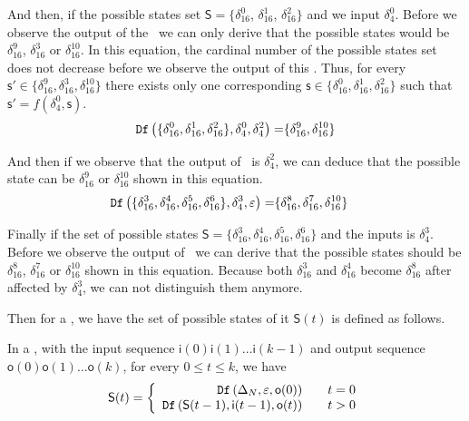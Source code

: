 \begin{example}
And then, if the possible states set $\mathsf{S}=\{\delta_{16}^0$, $\delta_{16}^1$, $\delta_{16}^2\}$ and we input $\delta_4^0$. Before we observe the output of the \BCN\ we can only derive that the possible states would be $\delta_{16}^{9}$, $\delta_{16}^3$ or  $\delta_{16}^{10}$. In this equation, the cardinal number of the possible states set does not decrease before we observe the output of this \BCN. Thus, for every $\mathsf{s}'\in\{\delta_{16}^{9},\delta_{16}^3,\delta_{16}^{10}\}$ there exists only one corresponding $\mathsf{s}\in\{\delta_{16}^{0},\delta_{16}^1,\delta_{16}^{2}\}$ such that $\mathsf{s}'=f( \delta_4^0, \mathsf{s})$.
\begin{equation*}
\begin{split}
{\tt Df}\left(\{\delta_{16}^0,\delta_{16}^1,\delta_{16}^2\},\delta_4^0,\delta_4^2\right)=&\{\delta_{16}^{9},\delta_{16}^{10}\}\\
\end{split}
\label{equ:11}
\end{equation*}

And then if we observe that the output of \BCN\ is $\delta_4^2$, we can deduce that the possible state can be $\delta_{16}^{9}$ or  $\delta_{16}^{10}$ shown in this equation. 
\begin{equation*}
\begin{split}
{\tt Df}\left(\{\delta_{16}^3,\delta_{16}^4,\delta_{16}^5,\delta_{16}^6\},\delta_4^3,\varepsilon\right)=&\{\delta_{16}^8,\delta_{16}^{7},\delta_{16}^{10}\}
\end{split}
\label{equ:12}
\end{equation*}

 Finally if the set of possible states $\mathsf{S}=\{\delta_{16}^3, \delta_{16}^4, \delta_{16}^5, \delta_{16}^6\}$ and the inputs is $\delta_4^3$. Before we observe the output of \BCN\ we can derive that the possible states should be $\delta_{16}^8$, $\delta_{16}^7$ or $\delta_{16}^{10}$ shown in this equation. Because both $\delta_{16}^3$ and $\delta_{16}^4$ become $\delta_{16}^8$ after affected by $\delta_4^3$, we can not distinguish them anymore. 
 \label{exa:8}
 \end{example}   
 
 Then for a \BCN, we have the set of possible states of it $\mathsf{S}(t)$ is defined as follows.
 \begin{definition}[$\mathsf{S}(t)$] In a \BCN, with the input sequence $\mathsf{i}(0)\mathsf{i}(1)\ldots\mathsf{i}(k-1)$ and output sequence $\mathsf{o}(0)\mathsf{o}(1)\ldots\mathsf{o}(k)$, for every $0\le t\le k$, we have
	\[\mathsf{S}(t)=\left\{
\begin{array}{rcl}
{\tt Df}\left(\Delta_N,\varepsilon,\mathsf{o}(0)\right)      &      & {t=0}\\
{\tt Df}\left(\mathsf{S}(t-1),\mathsf{i}(t-1),\mathsf{o}(t)\right)       &      & {t>0}
\end{array} \right. \]

\end{definition}
 
